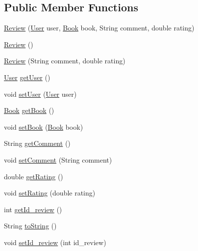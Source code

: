 \subsection*{Public Member Functions}
\begin{DoxyCompactItemize}
\item 
\hyperlink{classserver_1_1data_1_1_review_a4ca7a3db27290b1a96caea6a42e96f36}{Review} (\hyperlink{classserver_1_1data_1_1_user}{User} user, \hyperlink{classserver_1_1data_1_1_book}{Book} book, String comment, double rating)
\item 
\hyperlink{classserver_1_1data_1_1_review_ae9c80d66354aeacd317ad15643580d19}{Review} ()
\item 
\hyperlink{classserver_1_1data_1_1_review_aacee2551f0dcde344e7a7c5d7dc8f30a}{Review} (String comment, double rating)
\item 
\hyperlink{classserver_1_1data_1_1_user}{User} \hyperlink{classserver_1_1data_1_1_review_aae8a51666f66b55a66b4fe7adaba2611}{get\+User} ()
\item 
void \hyperlink{classserver_1_1data_1_1_review_ae3f9c2f431abf254ab7fb35f461fcfe3}{set\+User} (\hyperlink{classserver_1_1data_1_1_user}{User} user)
\item 
\hyperlink{classserver_1_1data_1_1_book}{Book} \hyperlink{classserver_1_1data_1_1_review_a4aca992ed23a4657a326762553cf76e6}{get\+Book} ()
\item 
void \hyperlink{classserver_1_1data_1_1_review_a51000ffda8d748b60488ded30a307bae}{set\+Book} (\hyperlink{classserver_1_1data_1_1_book}{Book} book)
\item 
String \hyperlink{classserver_1_1data_1_1_review_aea59de92d2edb03cf6adf1c3b6c53439}{get\+Comment} ()
\item 
void \hyperlink{classserver_1_1data_1_1_review_a59d8999bf366fdb81b52037a83e8dd15}{set\+Comment} (String comment)
\item 
double \hyperlink{classserver_1_1data_1_1_review_a496eaff532d0bcab68508dc1bda69b54}{get\+Rating} ()
\item 
void \hyperlink{classserver_1_1data_1_1_review_a5a55516c7af44fe0f0b40b1265df333d}{set\+Rating} (double rating)
\item 
int \hyperlink{classserver_1_1data_1_1_review_adc3e4303cb1d78270ae26c30d57c2425}{get\+Id\+\_\+review} ()
\item 
String \hyperlink{classserver_1_1data_1_1_review_a1abc364bd0ad24e6d3d3f33d55a110fc}{to\+String} ()
\item 
void \hyperlink{classserver_1_1data_1_1_review_a7017c3a8ded3a469d06f7866044b1e08}{set\+Id\+\_\+review} (int id\+\_\+review)
\end{DoxyCompactItemize}


